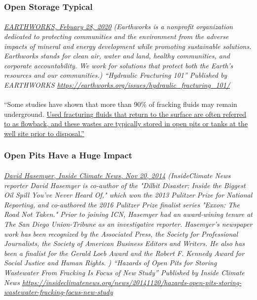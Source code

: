 \documentclass{article}
\begin{document}
\subsubsection{Open Storage Typical}
\paragraph{}
\small
\textit{
\underline{EARTHWORKS, Febuary 28, 2020}
(Earthworks is a nonprofit organization dedicated to protecting communities and the environment from the adverse impacts of mineral and energy development while promoting sustainable solutions. Earthworks stands for clean air, water and land, healthy communities, and corporate accountability. We work for solutions that protect both the Earth’s resources and our communities.) “Hydraulic Fracturing 101” Published by EARTHWORKS 
\url{https://earthworks.org/issues/hydraulic_fracturing_101/}}
\normalsize

\paragraph{}
``Some studies have shown that more than 90\% of fracking fluids may remain underground. \ul{Used fracturing fluids that return to the surface are often referred to as flowback, and these wastes are typically stored in open pits or tanks at the well site prior to disposal.''}

\subsubsection{Open Pits Have a Huge Impact}
\paragraph{}
\small
\textit{
\underline{David Hasemyer, Inside Climate News, Nov 20, 2014}
  (InsideClimate News reporter David Hasemyer is co-author of the "Dilbit Disaster: Inside the Biggest Oil Spill You've Never Heard Of," which won the 2013 Pulitzer Prize for National Reporting, and co-authored the 2016 Pulitzer Prize finalist series "Exxon: The Road Not Taken." Prior to joining ICN, Hasemyer had an award-wining tenure at The San Diego Union-Tribune as an investigative reporter. Hasemyer's newspaper work has been recognized by the Associated Press, the Society for Professional Journalists, the Society of American Business Editors and Writers. He also has been a finalist for the Gerald Loeb Award and the Robert F. Kennedy Award for Social Justice and Human Rights. ) “Hazards of Open Pits for Storing Wastewater From Fracking Is Focus of New Study” Published by Inside Climate News
\url{https://insideclimatenews.org/news/20141120/hazards-open-pits-storing-wastewater-fracking-focus-new-study }}
\normalsize
\end{document}
